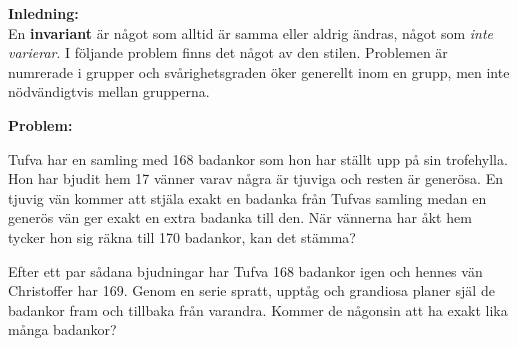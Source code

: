 % 
% 
% 



\textbf{\large{Inledning:}} \\
En \textbf{invariant} är något som alltid är samma eller aldrig ändras, något som \textit{inte varierar}. I följande problem finns det något av den stilen. Problemen är numrerade i grupper och svårighetsgraden öker generellt inom en grupp, men inte nödvändigtvis mellan grupperna.


\setcounter{theorem}{0}
\setcounter{section}{\thesection+1} %
\textbf{\large{Problem:}} \\
\vspace{-4ex}

\begin{problem}
	Tufva har en samling med 168 badankor som hon har ställt upp på sin trofehylla. Hon har bjudit hem 17 vänner varav några är tjuviga och resten är generösa. En tjuvig vän kommer att stjäla exakt en badanka från Tufvas samling medan en generös vän ger exakt en extra badanka till den. När vännerna har åkt hem tycker hon sig räkna till 170 badankor, kan det stämma?
\end{problem}

\begin{problem}
	Efter ett par sådana bjudningar har Tufva 168 badankor igen och hennes vän Christoffer har 169. Genom en serie spratt, upptåg och grandiosa planer själ de badankor fram och tillbaka från varandra. Kommer de någonsin att ha exakt lika många badankor?
\end{problem}

